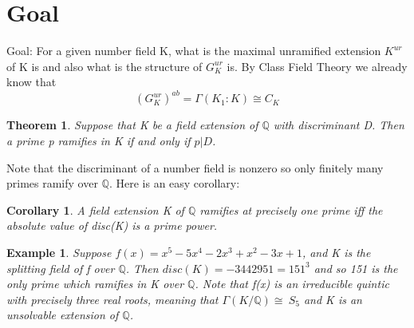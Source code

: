 \documentclass[preprint,12pt,reqno]{elsarticle}
\newtheorem{theorem}{Theorem}
\newtheorem{corollary}{Corollary}[theorem]
\newtheorem{example}{Example}
\begin{document}
\section{Goal}
Goal: For a given number field K, what is the maximal unramified extension $K^{ur}$ of K is and also what is the structure of $G_K^{ur}$ is. By Class Field Theory we already know that 
\begin{equation}
  (G_K^{ur})^{ab} = \Gamma(K_1:K)\cong C_K
\end{equation}
\begin{theorem}
 Suppose that K be a field extension of $\mathbb{Q}$ with discriminant D. Then a prime p
ramifies in K if and only if $p|D$.   
\end{theorem}
Note that the discriminant of a number field is nonzero so only finitely many primes ramify over $\mathbb{Q}$. Here is an easy corollary:
\begin{corollary}
A field extension K of $\mathbb{Q}$ ramifies at precisely one prime iff the absolute value of disc(K) is a prime power.
\end{corollary}
\begin{example}
    Suppose $f(x)=x^5-5x^4-2x^3+x^2-3x+1$, and K is the splitting field of f over $\mathbb{Q}$. Then $disc(K)=-3442951=151^3$ and so 151 is the only prime which ramifies in K over $\mathbb{Q}$. Note that f(x) is an irreducible quintic with precisely three real roots, meaning that $\Gamma(K/\mathbb{Q})\cong\ S_5$ and K is an unsolvable extension of $\mathbb{Q}$.
\end{example}
\end{document}
